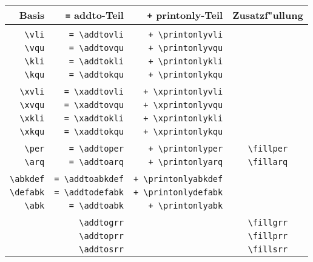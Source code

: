 \documentclass[12pt,a4paper]{article}
\begin{document}
\vspace{4ex}
 \begin{tabular}{rrrc}%
  \bf Basis      & \verb|=| \bf addto-Teil & \verb|+| \bf printonly-Teil & \bf Zusatzf"ullung \\ \hline
                 &                       &                           &                 \\
  \verb|\vli|    & \verb|= \addtovli|    & \verb|+ \printonlyvli|    &                 \\
  \verb|\vqu|    & \verb|= \addtovqu|    & \verb|+ \printonlyvqu|    &                 \\
  \verb|\kli|    & \verb|= \addtokli|    & \verb|+ \printonlykli|    &                 \\
  \verb|\kqu|    & \verb|= \addtokqu|    & \verb|+ \printonlykqu|    &                 \\
                 &                       &                           &                 \\
  \verb|\xvli|   & \verb|= \xaddtovli|   & \verb|+ \xprintonlyvli|   &                 \\
  \verb|\xvqu|   & \verb|= \xaddtovqu|   & \verb|+ \xprintonlyvqu|   &                 \\
  \verb|\xkli|   & \verb|= \xaddtokli|   & \verb|+ \xprintonlykli|   &                 \\
  \verb|\xkqu|   & \verb|= \xaddtokqu|   & \verb|+ \xprintonlykqu|   &                 \\
                 &                       &                           &                 \\
  \verb|\per|    & \verb|= \addtoper|    & \verb|+ \printonlyper|    & \verb|\fillper| \\
  \verb|\arq|    & \verb|= \addtoarq|    & \verb|+ \printonlyarq|    & \verb|\fillarq| \\
                 &                       &                           &                 \\
  \verb|\abkdef| & \verb|= \addtoabkdef| & \verb|+ \printonlyabkdef| &                 \\
  \verb|\defabk| & \verb|= \addtodefabk| & \verb|+ \printonlydefabk| &                 \\
  \verb|\abk|    & \verb|= \addtoabk|    & \verb|+ \printonlyabk|    &                 \\
                 &                       &                           &                 \\
                 & \verb|\addtogrr|      &                           & \verb|\fillgrr| \\
                 & \verb|\addtoprr|      &                           & \verb|\fillprr| \\
                 & \verb|\addtosrr|      &                           & \verb|\fillsrr| \\
 \end{tabular}
\end{document}
